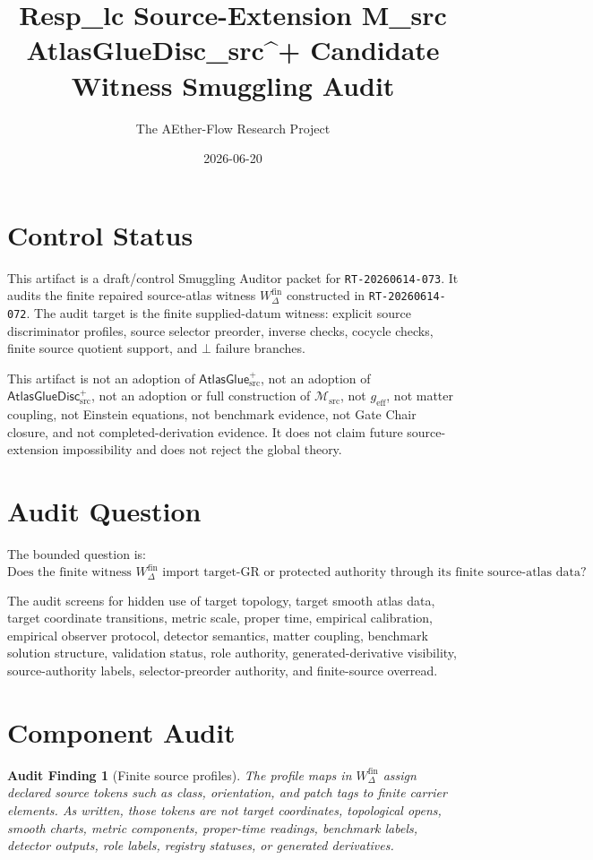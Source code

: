 \documentclass[11pt]{article}
\title{Resp\_lc Source-Extension M\_src AtlasGlueDisc\_src\^{}+ Candidate Witness Smuggling Audit}
\author{The AEther-Flow Research Project}
\date{2026-06-20}
\newcommand{\Msrc}{\mathcal{M}_{\mathrm{src}}}
\newcommand{\geff}{g_{\mathrm{eff}}}
\newcommand{\AtlasGlue}{\mathsf{AtlasGlue}_{\mathrm{src}}^{+}}
\newcommand{\AtlasGlueDisc}{\mathsf{AtlasGlueDisc}_{\mathrm{src}}^{+}}
\newcommand{\Bot}{\bot}
\newcommand{\Wfin}{W_{\Delta}^{\mathrm{fin}}}
\newtheorem{audit}{Audit Finding}
\begin{document}
\maketitle

\section*{Control Status}

This artifact is a draft/control Smuggling Auditor packet for
\texttt{RT-20260614-073}. It audits the finite repaired source-atlas witness
\(\Wfin\) constructed in \texttt{RT-20260614-072}. The audit target is the
finite supplied-datum witness: explicit source discriminator profiles, source
selector preorder, inverse checks, cocycle checks, finite source quotient
support, and \(\Bot\) failure branches.

This artifact is not an adoption of \(\AtlasGlue\), not an adoption of
\(\AtlasGlueDisc\), not an adoption or full construction of \(\Msrc\), not
\(\geff\), not matter coupling, not Einstein equations, not benchmark
evidence, not Gate Chair closure, and not completed-derivation evidence. It
does not claim future source-extension impossibility and does not reject the
global theory.

\section{Audit Question}

The bounded question is:
\[
\text{Does the finite witness }\Wfin\text{ import target-GR or protected
authority through its finite source-atlas data?}
\]

The audit screens for hidden use of target topology, target smooth atlas data,
target coordinate transitions, metric scale, proper time, empirical
calibration, empirical observer protocol, detector semantics, matter coupling,
benchmark solution structure, validation status, role authority,
generated-derivative visibility, source-authority labels, selector-preorder
authority, and finite-source overread.

\section{Component Audit}

\begin{audit}[Finite source profiles]
The profile maps in \(\Wfin\) assign declared source tokens such as class,
orientation, and patch tags to finite carrier elements. As written, those
tokens are not target coordinates, topological opens, smooth charts, metric
components, proper-time readings, benchmark labels, detector outputs, role
labels, registry statuses, or generated derivatives.
\end{audit}
\end{document}
